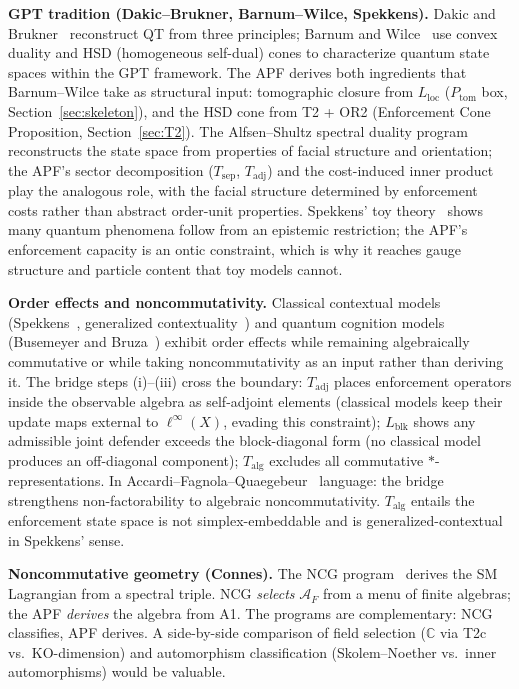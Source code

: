 \documentclass[11pt]{article}
\theoremstyle{remark}
\begin{document}
\smallskip\noindent\textbf{GPT tradition (Dakic--Brukner, Barnum--Wilce, Spekkens).}  Dakic and Brukner~\cite{DakicBrukner2009} reconstruct QT from three principles; Barnum and Wilce~\cite{BarnumWilce2012} use convex duality and HSD (homogeneous self-dual) cones to characterize quantum state spaces within the GPT framework.  The APF derives both ingredients that Barnum--Wilce take as structural input: tomographic closure from $L_{\mathrm{loc}}$ ($P_{\mathrm{tom}}$ box, Section~\ref{sec:skeleton}), and the HSD cone from T2 + OR2 (Enforcement Cone Proposition, Section~\ref{sec:T2}).  The Alfsen--Shultz spectral duality program~\cite{AlfsenShultz2003} reconstructs the state space from properties of facial structure and orientation; the APF's sector decomposition ($T_{\mathrm{sep}}$, $T_{\mathrm{adj}}$) and the cost-induced inner product play the analogous role, with the facial structure determined by enforcement costs rather than abstract order-unit properties.  Spekkens' toy theory~\cite{Spekkens2007} shows many quantum phenomena follow from an epistemic restriction; the APF's enforcement capacity is an ontic constraint, which is why it reaches gauge structure and particle content that toy models cannot.

\smallskip\noindent\textbf{Order effects and noncommutativity.}  Classical contextual models (Spekkens~\cite{Spekkens2005,Spekkens2007}, generalized contextuality~\cite{Schmid2021}) and quantum cognition models (Busemeyer and Bruza~\cite{BusemeyerBruza2012}) exhibit order effects while remaining algebraically commutative or while taking noncommutativity as an input rather than deriving it.  The bridge steps (i)--(iii) cross the boundary: $T_{\mathrm{adj}}$ places enforcement operators inside the observable algebra as self-adjoint elements (classical models keep their update maps external to $\ell^\infty(X)$, evading this constraint); $L_{\mathrm{blk}}$ shows any admissible joint defender exceeds the block-diagonal form (no classical model produces an off-diagonal component); $T_{\mathrm{alg}}$ excludes all commutative $*$-representations.  In Accardi--Fagnola--Quaegebeur~\cite{AFQ1992} language: the bridge strengthens non-factorability to algebraic noncommutativity.  $T_{\mathrm{alg}}$ entails the enforcement state space is not simplex-embeddable and is generalized-contextual in Spekkens' sense.

\smallskip\noindent\textbf{Noncommutative geometry (Connes).}  The NCG program~\cite{ConnesNCG1994,ChamseddineConnes1997} derives the SM Lagrangian from a spectral triple.  NCG \emph{selects} $\mathcal{A}_F$ from a menu of finite algebras; the APF \emph{derives} the algebra from A1.  The programs are complementary: NCG classifies, APF derives.  A side-by-side comparison of field selection ($\mathbb{C}$ via T2c vs.\ KO-dimension) and automorphism classification (Skolem--Noether vs.\ inner automorphisms) would be valuable.
\end{document}
